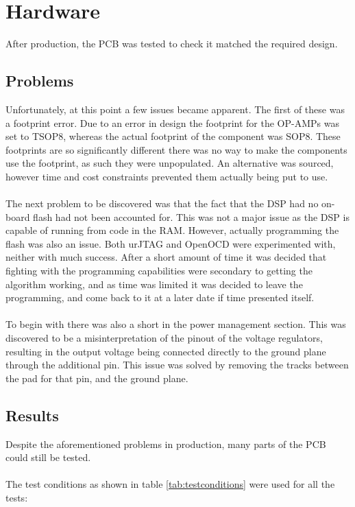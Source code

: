 \section{Hardware}

After production, the PCB was tested to check it matched the required design.

\subsection{Problems}
\label{ssec:testHWprobs}
Unfortunately, at this point a few issues became apparent.
The first of these was a footprint error.
Due to an error in design the footprint for the OP-AMPs was set to TSOP8, whereas the actual footprint of the component was SOP8.
These footprints are so significantly different there was no way to make the components use the footprint, as such they were unpopulated.
An alternative was sourced, however time and cost constraints prevented them actually being put to use.
\\
\\
The next problem to be discovered was that the fact that the DSP had no on-board flash had not been accounted for.
This was not a major issue as the DSP is capable of running from code in the RAM.
However, actually programming the flash was also an issue.
Both urJTAG and OpenOCD were experimented with, neither with much success.
After a short amount of time it was decided that fighting with the programming capabilities were secondary to getting the algorithm working, and as time was limited it was decided to leave the programming, and come back to it at a later date if time presented itself.
\\
\\
To begin with there was also a short in the power management section.
This was discovered to be a misinterpretation of the pinout of the voltage regulators, resulting in the output voltage being connected directly to the ground plane through the additional pin.
This issue was solved by removing the tracks between the pad for that pin, and the ground plane.

\subsection{Results}
Despite the aforementioned problems in production, many parts of the PCB could still be tested.
\\
\\
The test conditions as shown in table \ref{tab:testconditions} were used for all the tests:


